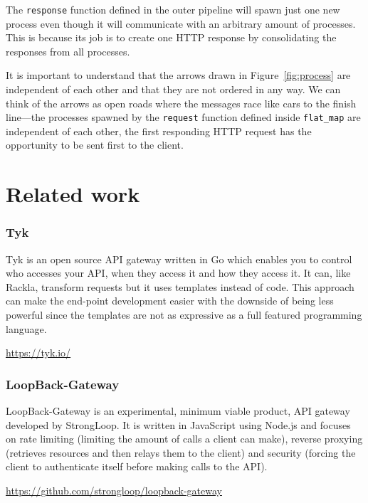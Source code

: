 \documentclass{cslthse-msc}
\begin{document}
The \lstinline{response} function defined in the outer pipeline will spawn just one new process even though it will communicate with an arbitrary amount of processes. This is because its job is to create one HTTP response by consolidating the responses from all processes.

It is important to understand that the arrows drawn in Figure~\ref{fig:process} are independent of each other and that they are not ordered in any way. We can think of the arrows as open roads where the messages race like cars to the finish line---the processes spawned by the \lstinline{request} function defined inside \lstinline{flat_map} are independent of each other, the first responding HTTP request has the opportunity to be sent first to the client.

\section{Related work}
\subsubsection{Tyk}

Tyk is an open source API gateway written in Go which enables you to control who accesses your API, when they access it and how they access it. It can, like Rackla, transform requests but it uses templates instead of code. This approach can make the end-point development easier with the downside of being less powerful since the templates are not as expressive as a full featured programming language.

\vspace{5mm}

\noindent \url{https://tyk.io/}

\subsubsection{LoopBack-Gateway}

LoopBack-Gateway is an experimental, minimum viable product, API gateway developed by StrongLoop. It is written in JavaScript using Node.js and focuses on rate limiting (limiting the amount of calls a client can make), reverse proxying (retrieves resources and then relays them to the client) and security (forcing the client to authenticate itself before making calls to the API).

\vspace{5mm}

\noindent \url{https://github.com/strongloop/loopback-gateway}
\end{document}
